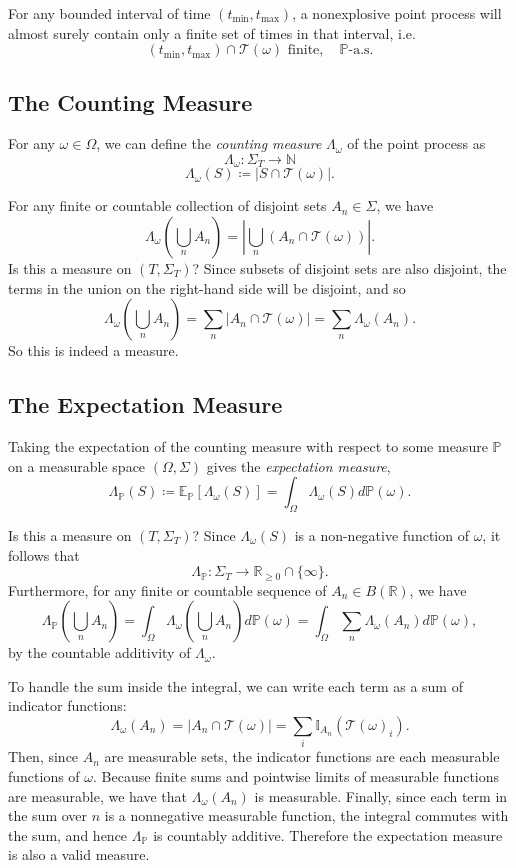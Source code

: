 \documentclass[honours,12pt]{unswthesis}
\numberwithin{equation}{section}
\begin{document}
For any bounded interval of time $(t_{\min},t_{\max})$, a nonexplosive point process will almost surely contain only a finite set of times in that interval, i.e.
$$(t_{\min},t_{\max}) \cap \mathcal{T}(\omega) \text{ finite},\quad\mathbb{P}\text{-a.s.}$$

\subsection{The Counting Measure}
For any $\omega\in\Omega$, we can define the \textit{counting measure} $\Lambda_\omega$ of the point process as
$$\Lambda_\omega : \Sigma_T \to \mathbb{N}$$
$$\Lambda_\omega(S) \coloneq \left\vert S\cap \mathcal{T}(\omega)\right\vert.$$

For any finite or countable collection of disjoint sets $A_n\in\Sigma$, we have
$$\Lambda_\omega\left(\bigcup_n A_n\right) = \left\vert \bigcup_n \left(A_n\cap\mathcal{T}(\omega)\right)\right\vert.$$
Is this a measure on $(T,\Sigma_T)$? Since subsets of disjoint sets are also disjoint, the terms in the union on the right-hand side will be disjoint, and so
$$\Lambda_\omega\left(\bigcup_n A_n\right) = \sum_n\left\vert A_n\cap \mathcal{T}(\omega)\right\vert = \sum_n \Lambda_\omega(A_n).$$
So this is indeed a measure.

\subsection{The Expectation Measure}
Taking the expectation of the counting measure with respect to some measure $\mathbb{P}$ on a measurable space $(\Omega,\Sigma)$ gives the \textit{expectation measure},
$$\Lambda_\mathbb{P}(S)\coloneq \mathbb{E}_\mathbb{P}\left[\Lambda_\omega(S)\right] = \int_\Omega \Lambda_\omega(S)d\mathbb{P}(\omega).$$

Is this a measure on $(T,\Sigma_T)$? Since $\Lambda_\omega(S)$ is a non-negative function of $\omega$, it follows that $$\Lambda_{\mathbb{P}} : \Sigma_T \to \mathbb{R}_{\geq 0}\cap\{\infty\}.$$ Furthermore, for any finite or countable sequence of $A_n\in B(\mathbb{R})$, we have $$\Lambda_\mathbb{P}\left(\bigcup_n A_n\right) = \int_\Omega \Lambda_\omega\left(\bigcup_n A_n\right)d\mathbb{P}(\omega) = \int_\Omega \sum_n \Lambda_\omega(A_n) d\mathbb{P}(\omega),$$
by the countable additivity of $\Lambda_\omega$.

To handle the sum inside the integral, we can write each term as a sum of indicator functions:
$$\Lambda_\omega(A_n) = \left\vert A_n\cap \mathcal{T}(\omega)\right\vert = \sum_i \mathbb{I}_{A_n}\left(\mathcal{T}(\omega)_i\right).$$
Then, since $A_n$ are measurable sets, the indicator functions are each measurable functions of $\omega$. Because finite sums and pointwise limits of measurable functions are measurable, we have that $\Lambda_\omega(A_n)$ is measurable.  Finally, since each term in the sum over $n$ is a nonnegative measurable function, the integral commutes with the sum, and hence $\Lambda_\mathbb{P}$ is countably additive. Therefore the expectation measure is also a valid measure.
\end{document}
